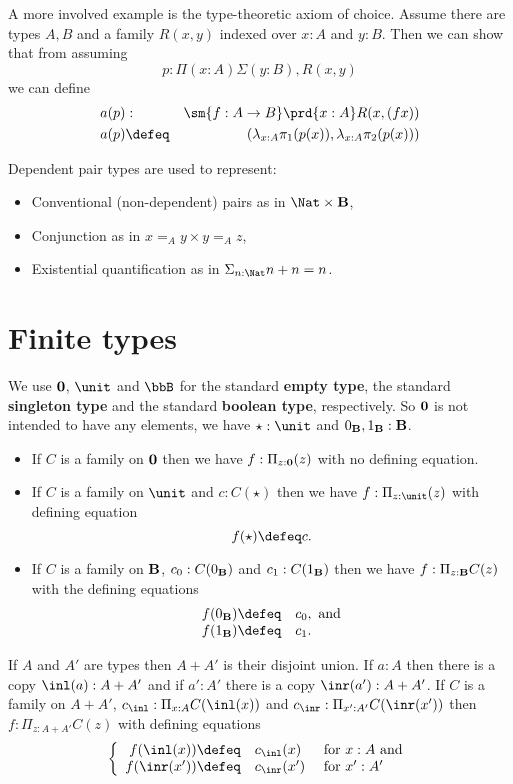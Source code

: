 {A more involved example is the type-theoretic axiom of choice. Assume
there are types $A,B$ and a family $R(x,y)$ indexed over $x:A$ and
$y:B$. Then we can show that from assuming 
\[p : \Pi(x:A)\Sigma(y :B),R(x,y)\] 
we can define 
\begin{eqnarray*}
a(p) & : & \sm{f : A \to B} \prd{x:A} R(x,(fx)) \\
a(p) & \defeq & (\lambda_{x:A} \pi_1(p(x)),\lambda_{x:A} \pi_2(p(x)))
\end{eqnarray*}

Dependent pair types are used to represent:
\begin{itemize}
\item Conventional (non-dependent) pairs as in $\Nat \times \bool$,
\item Conjunction as in $x =_A y \times y =_A z$,
\item Existential quantification as in $\Sigma_{n:\Nat}n+n = n$.
\end{itemize}

\section{Finite types}
\label{sec:finite-types}

We use ${\bf 0}$, $\unit$ and $\bbB$ for the standard {\bf empty
  type}, the standard {\bf singleton type} and the standard {\bf
  boolean type}, respectively.  So ${\bf 0}$ is not intended to have
any elements, we have $\star:\unit$ and $0_{\bf B},1_{\bf B}:{\bf B}$.
\begin{itemize}
\item If $C$ is a family on ${\bf 0}$ then we have $f:\Pi_{z:{\bf 0}}(z)$ with no defining equation.
\item If $C$ is a family on $\unit$ and $c:C(\star)$ then we have $f:\Pi_{z:\unit}(z)$ with defining equation
  \[ f(\star)\defeq c.\]
\item If $C$ is a family on ${\bf B}$, $c_0:C(0_{\bf B})$ 
and $c_1:C(1_{\bf B})$ then we have $f:\Pi_{z:{\bf B}}C(z)$ with the defining equations
 \[ \begin{array}{rl}
f(0_\bool) \defeq& c_0, \mbox{ and}\\
f(1_\bool) \defeq& c_1.
  \end{array}\]
\end{itemize}

If $A$ and $A'$ are types then $A+A'$ is their disjoint union.  If
$a:A$ then there is a copy $\inl(a):A+A'$ and if $a':A'$ there is a
copy $\inr(a'):A+A'$.
If $C$ is a family on $A+A'$, $c_\inl:\Pi_{x:A}C(\inl(x))$ and $c_\inr:\Pi_{x':A'}C(\inr(x'))$ then $f:\Pi_{z:A+A'}C(z)$ with defining equations
  \[\left\{\begin{array}{rll} 
f(\inl(x))\defeq& c_\inl(x)&\mbox{ for } x:A \mbox{ and}\\
f(\inr(x'))\defeq& c_\inr(x')&\mbox{ for } x':A'\\
\end{array}\right.\]

}
